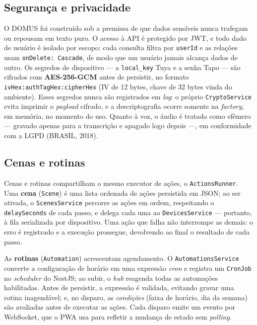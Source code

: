 
\subsection{Segurança e privacidade}

O DOMUS foi construído sob a premissa de que dados sensíveis nunca trafegam ou
repousam em texto puro. O acesso à API é protegido por JWT, e todo dado de
usuário é isolado por escopo: cada consulta filtra por \texttt{userId} e as
relações usam \texttt{onDelete: Cascade}, de modo que um usuário jamais alcança
dados de outro. Os segredos de dispositivo --- a \texttt{local\_key} Tuya e a
senha Tapo --- são cifrados com \textbf{AES-256-GCM} antes de persistir, no
formato \texttt{ivHex:authTagHex:cipherHex} (IV de 12 bytes, chave de 32 bytes
vinda do ambiente). Esses segredos nunca são registrados em \emph{log}: o
próprio \texttt{CryptoService} evita imprimir o \emph{payload} cifrado, e a
descriptografia ocorre somente na \emph{factory}, em memória, no momento do uso.
Quanto à voz, o áudio é tratado como efêmero --- gravado apenas para a
transcrição e apagado logo depois ---, em conformidade com a LGPD
(BRASIL, 2018).

\subsection{Cenas e rotinas}

Cenas e rotinas compartilham o mesmo executor de ações, o \texttt{ActionsRunner}.
Uma \textbf{cena} (\texttt{Scene}) é uma lista ordenada de ações persistida em
JSON; ao ser ativada, o \texttt{ScenesService} percorre as ações em ordem,
respeitando o \texttt{delaySeconds} de cada passo, e delega cada uma ao
\texttt{DevicesService} --- portanto, à fila serializada por dispositivo. Uma
ação que falha não interrompe as demais: o erro é registrado e a execução
prossegue, devolvendo ao final o resultado de cada passo.

As \textbf{rotinas} (\texttt{Automation}) acrescentam agendamento. O
\texttt{AutomationsService} converte a configuração de horário em uma expressão
\emph{cron} e registra um \texttt{CronJob} no \emph{scheduler} do NestJS; ao
subir, o \emph{hub} reagenda todas as automações habilitadas. Antes de persistir,
a expressão é validada, evitando gravar uma rotina inagendável; e, no disparo, as
\emph{condições} (faixa de horário, dia da semana) são avaliadas antes de
executar as ações. Cada disparo emite um evento por WebSocket, que o PWA usa para
refletir a mudança de estado sem \emph{polling}.

